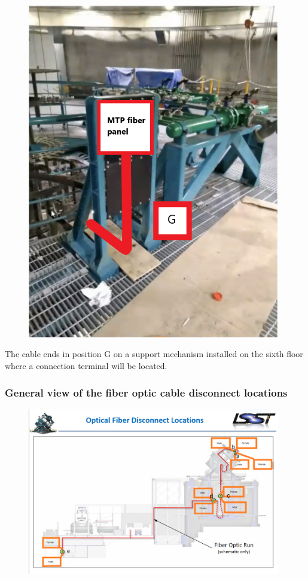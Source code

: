 \begin{figure}
  \includegraphics[width=11cm]{images/21.png}
  \centering
  \label{fig:jlsimon}
\end{figure}

  The cable ends in position G on a support mechanism installed on the sixth floor where a connection terminal will be located.

\subsubsection{General view of the fiber optic cable disconnect locations}

\begin{figure}
  \includegraphics[width=11cm]{images/22.png}
  \centering
  \label{fig:jlsimon}
\end{figure}

